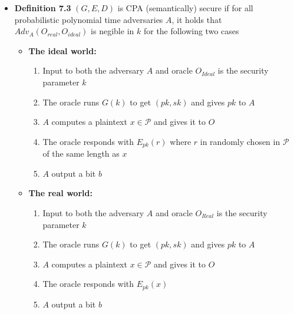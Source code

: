 \begin{itemize}
  \item \textbf{Definition 7.3} $(G,E,D)$ is CPA (semantically) secure if for all probabilistic polynomial time adversaries $A$, it holds that $Adv_A(O_{real}, O_{ideal})$ is negible in $k$ for the following two cases
  \begin{itemize}
  	\item \textbf{The ideal world:}
    \begin{enumerate}
  		\item Input to both the adversary $A$ and oracle $O_{Ideal}$ is the security parameter $k$
  		\item The oracle runs $G(k)$ to get $(pk,sk)$ and gives $pk$ to $A$
  		\item $A$ computes a plaintext $x \in \mathcal P$ and gives it to $O$
  		\item The oracle responds with $E_{pk}(r)$ where $r$ in randomly chosen in $\mathcal P$ of the same length as $x$
  		\item $A$ output a bit $b$
    \end{enumerate}
  	\item \textbf{The real world:}
    \begin{enumerate}
  		\item Input to both the adversary $A$ and oracle $O_{Real}$ is the security parameter $k$
  		\item The oracle runs $G(k)$ to get $(pk,sk)$ and gives $pk$ to $A$
  		\item $A$ computes a plaintext $x \in \mathcal P$ and gives it to $O$
  		\item The oracle responds with $E_{pk}(x)$ 
  		\item $A$ output a bit $b$
    \end{enumerate}
  \end{itemize}
\end{itemize}

